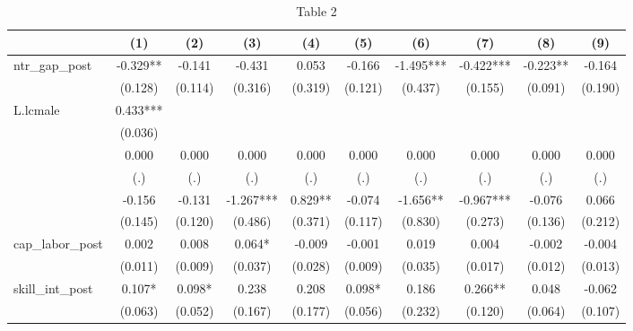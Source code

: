 \begin{table}[htbp]\centering
\def\sym#1{\ifmmode^{#1}\else\(^{#1}\)\fi}
\caption{Table 2}
\begin{tabular}{l*{9}{c}}
\toprule
                    &\multicolumn{1}{c}{(1)}   &\multicolumn{1}{c}{(2)}   &\multicolumn{1}{c}{(3)}   &\multicolumn{1}{c}{(4)}   &\multicolumn{1}{c}{(5)}   &\multicolumn{1}{c}{(6)}   &\multicolumn{1}{c}{(7)}   &\multicolumn{1}{c}{(8)}   &\multicolumn{1}{c}{(9)}   \\
\midrule
ntr\_gap\_post        &   -0.329** &   -0.141   &   -0.431   &    0.053   &   -0.166   &   -1.495***&   -0.422***&   -0.223** &   -0.164   \\
                    &  (0.128)   &  (0.114)   &  (0.316)   &  (0.319)   &  (0.121)   &  (0.437)   &  (0.155)   &  (0.091)   &  (0.190)   \\
\addlinespace
L.lcmale            &    0.433***&            &            &            &            &            &            &            &            \\
                    &  (0.036)   &            &            &            &            &            &            &            &            \\
\addlinespace
2000                &    0.000   &    0.000   &    0.000   &    0.000   &    0.000   &    0.000   &    0.000   &    0.000   &    0.000   \\
                    &      (.)   &      (.)   &      (.)   &      (.)   &      (.)   &      (.)   &      (.)   &      (.)   &      (.)   \\
\addlinespace
2010                &   -0.156   &   -0.131   &   -1.267***&    0.829** &   -0.074   &   -1.656** &   -0.967***&   -0.076   &    0.066   \\
                    &  (0.145)   &  (0.120)   &  (0.486)   &  (0.371)   &  (0.117)   &  (0.830)   &  (0.273)   &  (0.136)   &  (0.212)   \\
\addlinespace
cap\_labor\_post      &    0.002   &    0.008   &    0.064*  &   -0.009   &   -0.001   &    0.019   &    0.004   &   -0.002   &   -0.004   \\
                    &  (0.011)   &  (0.009)   &  (0.037)   &  (0.028)   &  (0.009)   &  (0.035)   &  (0.017)   &  (0.012)   &  (0.013)   \\
\addlinespace
skill\_int\_post      &    0.107*  &    0.098*  &    0.238   &    0.208   &    0.098*  &    0.186   &    0.266** &    0.048   &   -0.062   \\
                    &  (0.063)   &  (0.052)   &  (0.167)   &  (0.177)   &  (0.056)   &  (0.232)   &  (0.120)   &  (0.064)   &  (0.107)   \\

\end{tabular}
\end{table}
